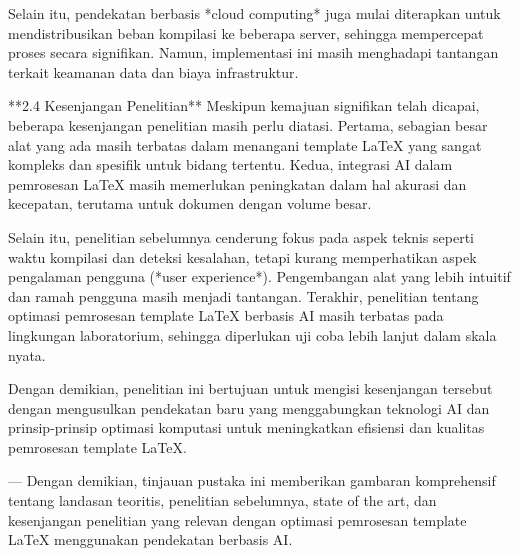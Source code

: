 \documentclass{Configuration_Files/PoliMi3i_thesis}
\begin{document}
Selain itu, pendekatan berbasis *cloud computing* juga mulai diterapkan untuk mendistribusikan beban kompilasi ke beberapa server, sehingga mempercepat proses secara signifikan. Namun, implementasi ini masih menghadapi tantangan terkait keamanan data dan biaya infrastruktur.  

**2.4 Kesenjangan Penelitian**  
Meskipun kemajuan signifikan telah dicapai, beberapa kesenjangan penelitian masih perlu diatasi. Pertama, sebagian besar alat yang ada masih terbatas dalam menangani template LaTeX yang sangat kompleks dan spesifik untuk bidang tertentu. Kedua, integrasi AI dalam pemrosesan LaTeX masih memerlukan peningkatan dalam hal akurasi dan kecepatan, terutama untuk dokumen dengan volume besar.  

Selain itu, penelitian sebelumnya cenderung fokus pada aspek teknis seperti waktu kompilasi dan deteksi kesalahan, tetapi kurang memperhatikan aspek pengalaman pengguna (*user experience*). Pengembangan alat yang lebih intuitif dan ramah pengguna masih menjadi tantangan. Terakhir, penelitian tentang optimasi pemrosesan template LaTeX berbasis AI masih terbatas pada lingkungan laboratorium, sehingga diperlukan uji coba lebih lanjut dalam skala nyata.  

Dengan demikian, penelitian ini bertujuan untuk mengisi kesenjangan tersebut dengan mengusulkan pendekatan baru yang menggabungkan teknologi AI dan prinsip-prinsip optimasi komputasi untuk meningkatkan efisiensi dan kualitas pemrosesan template LaTeX.  

---  
Dengan demikian, tinjauan pustaka ini memberikan gambaran komprehensif tentang landasan teoritis, penelitian sebelumnya, state of the art, dan kesenjangan penelitian yang relevan dengan optimasi pemrosesan template LaTeX menggunakan pendekatan berbasis AI.
\end{document}
